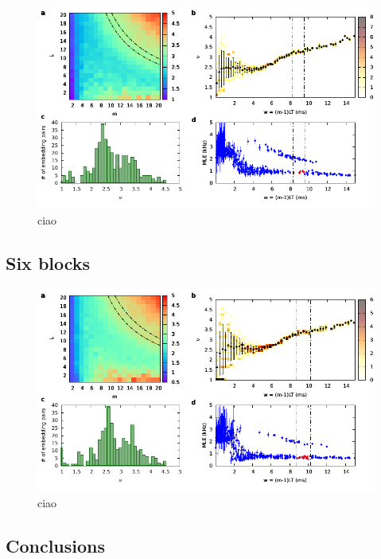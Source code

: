 \documentclass[a4paper,11pt,aps,secnumarabic,balancelastpage,amsmath,amssymb,floatfix,table]{article}
\begin{document}
\begin{figure}[H]
    \centering
    \includegraphics[width=\linewidth]{../5_blocks/2e5_points/plots/chaos.pdf}
    \caption{ciao}
    \label{fig:5 blocks chaos}
\end{figure}

\subsection{Six blocks}

\begin{figure}[H]
    \centering
    \includegraphics[width=\linewidth]{../6_blocks/2e5_points/plots/chaos.pdf}
    \caption{ciao}
    \label{fig:6 blocks chaos}
\end{figure}

\subsection{Conclusions}
\end{document}

